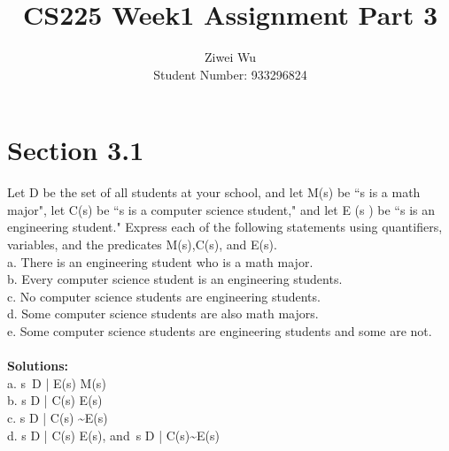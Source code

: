 \documentclass[11pt]{article}
\newenvironment{exercise}[2][Exercise]{\begin{trivlist}
\item[\hskip \labelsep {\bfseries #1}\hskip \labelsep {\bfseries #2.}]}{\end{trivlist}}
\begin{document}


\title{CS225 Week1 Assignment Part 3}%
\author{Ziwei Wu\\ %
Student Number: 933296824} %

\maketitle

\section*{Section 3.1}
\begin{exercise}{18}
Let D be the set of all students at your school,
and let M(s) be ``s is a math major", let C(s) be ``s is a
computer science student," and let E (s ) be ``s is an
engineering student." Express each of the following statements
using quantifiers, variables, and the predicates M(s),C(s), and E(s).\\
a. There is an engineering student who is a math major.\\
b. Every computer science student is an engineering students. \\
c. No computer science students are engineering students.\\
d. Some computer science students are also math majors.\\
e. Some computer science students are engineering students and some are not.\\
\\
\textbf{Solutions:}\\
a. s\ \in D | E(s) \wedge M(s)\\
b. \forall s \in D | C(s) \rightarrow E(s)\\
c. \forall s \in D | C(s) \rightarrow \sim E(s)\\
d. \exists s \in D | C(s) \wedge E(s), and\ \exists s \in D | C(s)\wedge \sim E(s)\\
\end{exercise}
\end{document}
